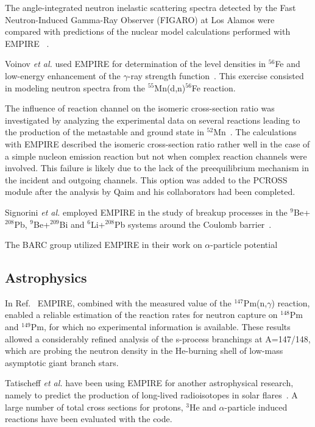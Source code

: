 The angle-integrated neutron inelastic scattering spectra detected by the
Fast Neutron-Induced Gamma-Ray Observer (FIGARO) at Los Alamos were compared
with predictions of the nuclear model calculations performed with EMPIRE~%
\cite{rochman2004nir}.

Voinov \textit{et al.} used EMPIRE for determination of the level densities
in $^{56}$Fe and low-energy enhancement of the $\gamma$-ray strength
function~\cite{Voinov:06}. This exercise consisted in modeling neutron
spectra from the $^{55}$Mn(d,n)$^{56}$Fe reaction.

The influence of reaction channel on the isomeric cross-section ratio was
investigated by analyzing the experimental data on several reactions leading
to the production of the metastable and ground state in $^{52}$Mn~\cite%
{Qaim:05}. The calculations with EMPIRE described the isomeric cross-section
ratio rather well in the case of a simple nucleon emission reaction but not
when complex reaction channels were involved. This failure is likely due to
the lack of the preequilibrium mechanism in the incident and outgoing
channels. This option was added to the PCROSS module after the analysis by
Qaim and his collaborators had been completed.

Signorini \textit{et al.} employed EMPIRE in the study of breakup processes
in the $^9$Be+$^{208}$Pb, $^9$Be+$^{209}$Bi and $^6$Li+$^{208}$Pb systems
around the Coulomb barrier~\cite{signorini2004bps}.

The BARC group utilized EMPIRE in their work on $\alpha$-particle potential~%
\cite{Kumar:06}

\subsection{Astrophysics}

In Ref.~\cite{reifarth2003snc} EMPIRE, combined with the measured value of
the $^{147}$Pm(n,$\gamma$) reaction, enabled a reliable estimation of the
reaction rates for neutron capture on $^{148}$Pm and $^{149}$Pm, for which
no experimental information is available. These results allowed a
considerably refined analysis of the s-process branchings at A=147/148,
which are probing the neutron density in the He-burning shell of low-mass
asymptotic giant branch stars.

Tatischeff \textit{et al.} have been using EMPIRE for another astrophysical
research, namely to predict the production of long-lived radioisotopes in
solar flares~\cite{Tatischeff:06}. A large number of total cross sections
for protons, $^3$He and $\alpha$-particle induced reactions have been
evaluated with the code.

